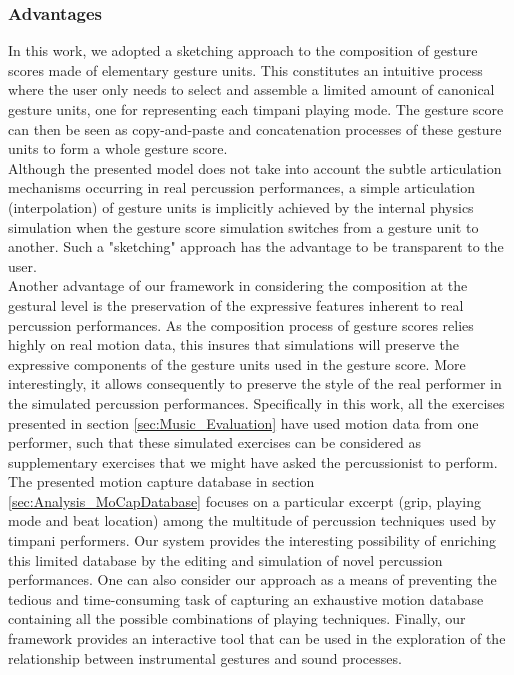 			\subsubsection{Advantages}

In this work, we adopted a sketching approach to the composition of gesture scores made of elementary gesture units. This constitutes an intuitive process where the user only needs to select and assemble a limited amount of canonical gesture units, one for representing each timpani playing mode. The gesture score can then be seen as copy-and-paste and concatenation processes of these gesture units to form a whole gesture score.\\

Although the presented model does not take into account the subtle articulation mechanisms occurring in real percussion performances, a simple articulation (interpolation) of gesture units is implicitly achieved by the internal physics simulation when the gesture score simulation switches from a gesture unit to another. Such a "sketching" approach has the advantage to be transparent to the user.\\

Another advantage of our framework in considering the composition at the gestural level is the preservation of the expressive features inherent to real percussion performances. As the composition process of gesture scores relies highly on real motion data, this insures that simulations will preserve the expressive components of the gesture units used in the gesture score. More interestingly, it allows consequently to preserve the style of the real performer in the simulated percussion performances. Specifically in this work, all the exercises presented in section \ref{sec:Music_Evaluation} have used motion data from one performer, such that these simulated exercises can be considered as supplementary exercises that we might have asked the percussionist to perform.\\

The presented motion capture database in section \ref{sec:Analysis_MoCapDatabase} focuses on a particular excerpt (grip, playing mode and beat location) among the multitude of percussion techniques used by timpani performers. Our system provides the interesting possibility of enriching this limited database by the editing and simulation of novel percussion performances. One can also consider our approach as a means of preventing the tedious and time-consuming task of capturing an exhaustive motion database containing all the possible combinations of playing techniques. %
Finally, our framework provides an interactive tool that can be used in the exploration of the relationship between instrumental gestures and sound processes.


